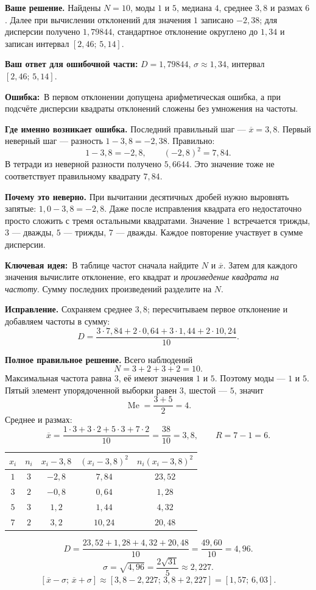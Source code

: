 \documentclass[a4paper,12pt]{article}
\newcommand{\err}{\textcolor{error}{\textbf{Ошибка:}}}
\newcommand{\key}{\textcolor{hint}{\textbf{Ключевая идея:}}}
\begin{document}
\textbf{Ваше решение.} Найдены $N=10$, моды $1$ и $5$, медиана $4$, среднее $3{,}8$ и размах $6$. Далее при вычислении отклонений для значения $1$ записано $-2{,}38$; для дисперсии получено $1{,}79844$, стандартное отклонение округлено до $1{,}34$ и записан интервал $[2{,}46;\,5{,}14]$.

\textbf{Ваш ответ для ошибочной части:} $D=1{,}79844$, $\sigma\approx1{,}34$, интервал $[2{,}46;\,5{,}14]$.

\err\ В первом отклонении допущена арифметическая ошибка, а при подсчёте дисперсии квадраты отклонений сложены без умножения на частоты.

\textbf{Где именно возникает ошибка.} Последний правильный шаг --- $\overline{x}=3{,}8$. Первый неверный шаг --- разность $1-3{,}8=-2{,}38$. Правильно:
\[
1-3{,}8=\boxed{-2{,}8},\qquad (-2{,}8)^2=\boxed{7{,}84}.
\]
В тетради из неверной разности получено $5{,}6644$. Это значение тоже не соответствует правильному квадрату $7{,}84$.

\textbf{Почему это неверно.} При вычитании десятичных дробей нужно выровнять запятые: $1{,}0-3{,}8=-2{,}8$. Даже после исправления квадрата его недостаточно просто сложить с тремя остальными квадратами. Значение $1$ встречается трижды, $3$ --- дважды, $5$ --- трижды, $7$ --- дважды. Каждое повторение участвует в сумме дисперсии.

\key\ В таблице частот сначала найдите $N$ и $\overline{x}$. Затем для каждого значения вычислите отклонение, его квадрат и \emph{произведение квадрата на частоту}. Сумму последних произведений разделите на $N$.

\textbf{Исправление.} Сохраняем среднее $3{,}8$; пересчитываем первое отклонение и добавляем частоты в сумму:
\[
D=\frac{3\cdot7{,}84+2\cdot0{,}64+3\cdot1{,}44+2\cdot10{,}24}{10}.
\]

\textbf{Полное правильное решение.} Всего наблюдений
\[
N=3+2+3+2=10.
\]
Максимальная частота равна $3$, её имеют значения $1$ и $5$. Поэтому моды --- $1$ и $5$. Пятый элемент упорядоченной выборки равен $3$, шестой --- $5$, значит
\[
\operatorname{Me}=\frac{3+5}{2}=4.
\]
Среднее и размах:
\[
\overline{x}=\frac{1\cdot3+3\cdot2+5\cdot3+7\cdot2}{10}=\frac{38}{10}=3{,}8,
\qquad R=7-1=6.
\]
\begin{center}
\renewcommand{\arraystretch}{1.26}
\begin{tabular}{@{}c c c c c@{}}
\toprule
$x_i$ & $n_i$ & $x_i-3{,}8$ & $(x_i-3{,}8)^2$ & $n_i(x_i-3{,}8)^2$\\
\midrule
$1$ & $3$ & $-2{,}8$ & $7{,}84$ & $23{,}52$\\
$3$ & $2$ & $-0{,}8$ & $0{,}64$ & $1{,}28$\\
$5$ & $3$ & $1{,}2$ & $1{,}44$ & $4{,}32$\\
$7$ & $2$ & $3{,}2$ & $10{,}24$ & $20{,}48$\\
\bottomrule
\end{tabular}
\end{center}
\[
D=\frac{23{,}52+1{,}28+4{,}32+20{,}48}{10}
=\frac{49{,}60}{10}=\boxed{4{,}96}.
\]
\[
\sigma=\sqrt{4{,}96}=\frac{2\sqrt{31}}5\approx2{,}227.
\]
\[
[\overline{x}-\sigma;\,\overline{x}+\sigma]
\approx[3{,}8-2{,}227;\,3{,}8+2{,}227]
=\boxed{[1{,}57;\,6{,}03]}.
\]
\end{document}
